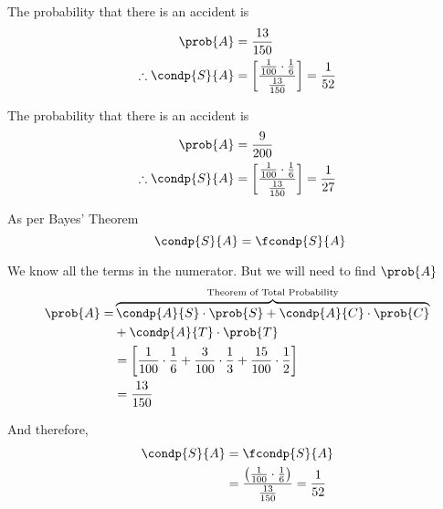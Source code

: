 \documentclass[14pt,fleqn]{extarticle}
\begin{document}
\begin{problem}
\begin{step}
\end{step}

\begin{step}
  \begin{options} 
     \correct 
     
       The probability that there is an accident is 
       \begin{align}
       \prob{A} &= \frac{13}{150} \\
       \therefore \condp{S}{A} &= \left[ \dfrac{\frac{1}{100}\cdot\frac{1}{6}}{\frac{13}{150}}\right] =\frac{1}{52} 
\end{align}
     \incorrect
     
     The probability that there is an accident is 
       \begin{align}
       \prob{A} &= \frac{9}{200} \\
       \therefore \condp{S}{A} &= \left[ \dfrac{\frac{1}{100}\cdot\frac{1}{6}}{\frac{13}{150}}\right] =\frac{1}{27} 
\end{align}
        
    \end{options} 
     \reason 
       
     As per Bayes' Theorem 
     \[ \qquad \condp{S}{A} = \fcondp{S}{A}  \]
     
     We know all the terms in the numerator. But we will need to find $\prob{A}$
     \begin{align}
	\prob{A} = &\overbrace{\condp{A}{S}\cdot\prob{S} + \condp{A}{C}\cdot\prob{C}}^{\text{Theorem of Total Probability}} \\
	&+ \condp{A}{T}\cdot\prob{T} \\
	&= \left[ \frac{1}{100}\cdot\frac{1}{6} + \frac{3}{100}\cdot\frac{1}{3} + \frac{15}{100}\cdot\frac{1}{2} \right] \\
	&= \frac{13}{150} 
\end{align}

And therefore, 
\begin{align}
\condp{S}{A} &= \fcondp{S}{A} \\
&= \dfrac{ \left( \frac{1}{100}\cdot\frac{1}{6}\right)}{\frac{13}{150}} = \frac{1}{52}
\end{align}

\end{step}
          
\end{problem} 
\end{document}
